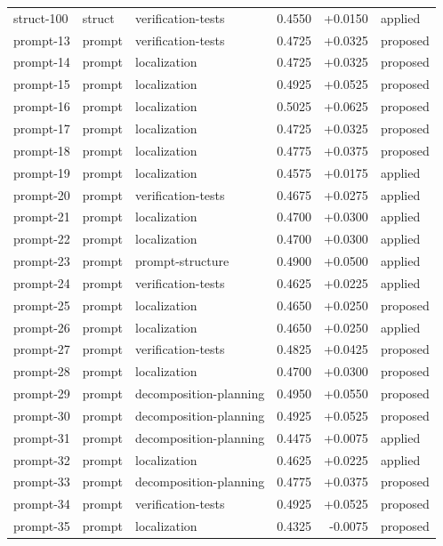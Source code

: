 \begin{center}
\begin{longtable}{llp{5.2cm}rrl}
struct-100 & struct & verification-tests & 0.4550 & +0.0150 & applied \\
prompt-13 & prompt & verification-tests & 0.4725 & +0.0325 & proposed \\
prompt-14 & prompt & localization & 0.4725 & +0.0325 & proposed \\
prompt-15 & prompt & localization & 0.4925 & +0.0525 & proposed \\
prompt-16 & prompt & localization & 0.5025 & +0.0625 & proposed \\
prompt-17 & prompt & localization & 0.4725 & +0.0325 & proposed \\
prompt-18 & prompt & localization & 0.4775 & +0.0375 & proposed \\
prompt-19 & prompt & localization & 0.4575 & +0.0175 & applied \\
prompt-20 & prompt & verification-tests & 0.4675 & +0.0275 & applied \\
prompt-21 & prompt & localization & 0.4700 & +0.0300 & applied \\
prompt-22 & prompt & localization & 0.4700 & +0.0300 & applied \\
prompt-23 & prompt & prompt-structure & 0.4900 & +0.0500 & applied \\
prompt-24 & prompt & verification-tests & 0.4625 & +0.0225 & applied \\
prompt-25 & prompt & localization & 0.4650 & +0.0250 & proposed \\
prompt-26 & prompt & localization & 0.4650 & +0.0250 & applied \\
prompt-27 & prompt & verification-tests & 0.4825 & +0.0425 & proposed \\
prompt-28 & prompt & localization & 0.4700 & +0.0300 & proposed \\
prompt-29 & prompt & decomposition-planning & 0.4950 & +0.0550 & proposed \\
prompt-30 & prompt & decomposition-planning & 0.4925 & +0.0525 & proposed \\
prompt-31 & prompt & decomposition-planning & 0.4475 & +0.0075 & applied \\
prompt-32 & prompt & localization & 0.4625 & +0.0225 & applied \\
prompt-33 & prompt & decomposition-planning & 0.4775 & +0.0375 & proposed \\
prompt-34 & prompt & verification-tests & 0.4925 & +0.0525 & proposed \\
prompt-35 & prompt & localization & 0.4325 & -0.0075 & proposed \\

\end{longtable}
\end{center}
